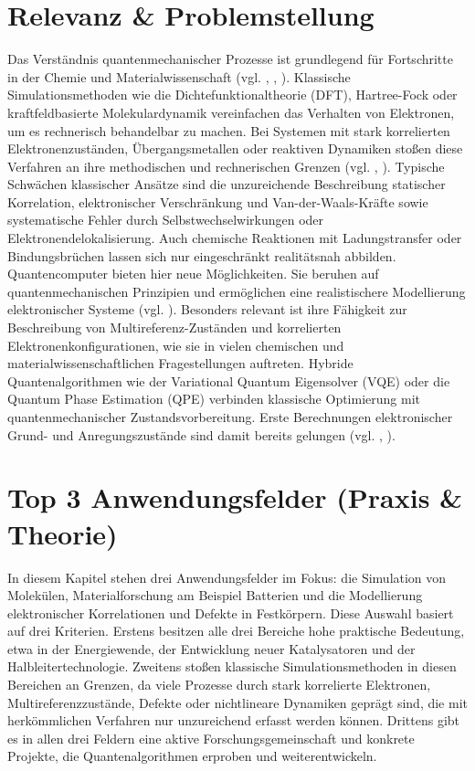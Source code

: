 \section{Relevanz \& Problemstellung}
\label{Chemie_Problemstellung}
Das Verständnis quantenmechanischer Prozesse ist grundlegend für Fortschritte in der Chemie und Materialwissenschaft (vgl. \cite{hanaor_computational_2024}, \cite{daley_practical_2022}, \cite{bauer_quantum_2020}). Klassische Simulationsmethoden wie die Dichtefunktionaltheorie (DFT), Hartree-Fock oder kraftfeldbasierte Molekulardynamik vereinfachen das Verhalten von Elektronen, um es rechnerisch behandelbar zu machen. Bei Systemen mit stark korrelierten Elektronenzuständen, Übergangsmetallen oder reaktiven Dynamiken stoßen diese Verfahren an ihre methodischen und rechnerischen Grenzen (vgl. \cite{cao_quantum_2019}, \cite{vermaStatusChallengesDensity2020}). Typische Schwächen klassischer Ansätze sind die unzureichende Beschreibung statischer Korrelation, elektronischer Verschränkung und Van-der-Waals-Kräfte sowie systematische Fehler durch Selbstwechselwirkungen oder Elektronendelokalisierung. Auch chemische Reaktionen mit Ladungstransfer oder Bindungsbrüchen lassen sich nur eingeschränkt realitätsnah abbilden. Quantencomputer bieten hier neue Möglichkeiten. Sie beruhen auf quantenmechanischen Prinzipien und ermöglichen eine realistischere Modellierung elektronischer Systeme (vgl. \cite{akromDevelopmentQuantumMachine2024}). Besonders relevant ist ihre Fähigkeit zur Beschreibung von Multireferenz-Zuständen und korrelierten Elektronenkonfigurationen, wie sie in vielen chemischen und materialwissenschaftlichen Fragestellungen auftreten. Hybride Quantenalgorithmen wie der Variational Quantum Eigensolver (VQE) oder die Quantum Phase Estimation (QPE) verbinden klassische Optimierung mit quantenmechanischer Zustandsvorbereitung. Erste Berechnungen elektronischer Grund- und Anregungszustände sind damit bereits gelungen (vgl. \cite{aspuru-guzik_simulated_2005}, \cite{weidman_quantum_2024}). 

\section{Top 3 Anwendungsfelder (Praxis \& Theorie)}
\label{Chemie_Anwendungsfelder}
{In diesem Kapitel stehen drei Anwendungsfelder im Fokus: die Simulation von Molekülen, Materialforschung am Beispiel Batterien und die Modellierung elektronischer Korrelationen und Defekte in Festkörpern.
Diese Auswahl basiert auf drei Kriterien. Erstens besitzen alle drei Bereiche hohe praktische Bedeutung, etwa in der Energiewende, der Entwicklung neuer Katalysatoren und der Halbleitertechnologie. Zweitens stoßen klassische Simulationsmethoden in diesen Bereichen an Grenzen, da viele Prozesse durch stark korrelierte Elektronen, Multireferenzzustände, Defekte oder nichtlineare Dynamiken geprägt sind, die mit herkömmlichen Verfahren nur unzureichend erfasst werden können. Drittens gibt es in allen drei Feldern eine aktive Forschungsgemeinschaft und konkrete Projekte, die Quantenalgorithmen erproben und weiterentwickeln.}

